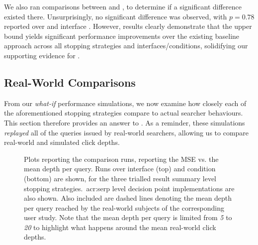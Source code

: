 We also ran comparisons between  and , to determine if a significant difference existed there. Unsurprisingly, no significant difference was observed, with $p=0.78$ reported over  and interface . However, results clearly demonstrate that the upper bound  yields significant performance improvements over the existing baseline approach across all stopping strategies and interfaces/conditions, solidifying our supporting evidence for .

\subsection{Real-World Comparisons}\label{sec:serp:results:comparisons}
From our \emph{what-if} performance simulations, we now examine how closely each of the aforementioned stopping strategies compare to actual searcher behaviours. This section therefore provides an answer to . As a reminder, these simulations \emph{replayed} all of the queries issued by real-world searchers, allowing us to compare real-world and simulated click depths.

\begin{figure}[t!]
    \centering
    \caption[Real-world comparisons over the~\gls{acr:serp} decision point]{Plots reporting the comparison runs, reporting the MSE vs. the mean depth per query. Runs over interface  (top) and condition  (bottom) are shown, for the three trialled result summary level stopping strategies.~\gls{acr:serp} level decision point implementations are also shown. Also included are dashed lines denoting the mean depth per query reached by the real-world subjects of the corresponding user study. Note that the mean depth per query is limited from \emph{5} to \emph{20} to highlight what happens around the mean real-world click depths.}
    \label{fig:ch9_comparison_plots}
\end{figure}

